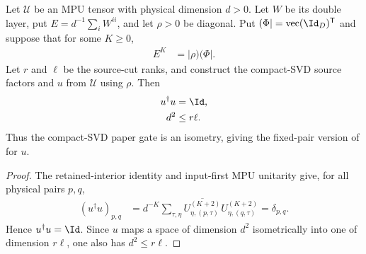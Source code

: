\begin{lemma}
    \label{lem:mpu_admissible_source_u_isometry}
    \leanok
    Let $\mathcal U$ be an MPU tensor with physical dimension $d>0$. Let $W$
    be its double layer, put $E=d^{-1}\sum_iW^{ii}$, and let $\rho>0$ be
    diagonal. Put $(\Phi\rvert=\operatorname{vec}(\Id_D)^{\mathsf T}$ and
    suppose that for some $K\geq0$,
    \begin{align}
        E^K & =\lvert\rho)(\Phi\rvert.
    \end{align}
    Let $r$ and $\ell$ be the source-cut ranks, and construct the compact-SVD
    source factors and $u$ from $\mathcal U$ using $\rho$. Then
    \begin{align}
        u^\dagger u & =\Id,       \\
        d^2         & \leq r\ell.
    \end{align}
    Thus the compact-SVD paper gate is an isometry, giving the
    fixed-pair version of \cite[Lemma~III.7]{Cirac2017MPU} for $u$.
\end{lemma}

\begin{proof}\leanok
    The retained-interior identity and input-first MPU unitarity give, for all
    physical pairs $p,q$,
    \begin{align}
        (u^\dagger u)_{p,q}
         & =d^{-K}\sum_{\tau,\eta}
        \overline{U^{(K+2)}_{\eta,(p,\tau)}}
        U^{(K+2)}_{\eta,(q,\tau)}
        =\delta_{p,q}.
    \end{align}
    Hence $u^\dagger u=\Id$. Since $u$ maps a space of dimension $d^2$
    isometrically into one of dimension $r\ell$, one also has $d^2\leq r\ell$.
\end{proof}

